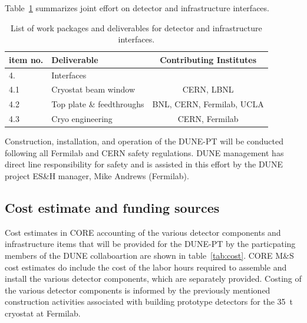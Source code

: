 Table~\ref{tab:wbs-interfaces} summarizes joint effort on detector and infrastructure interfaces.
%
\begin{table}[h]
\centering
\begin{tabular}{|l l c|}
\hline
\textbf{item no. } & \textbf{Deliverable}  & \textbf{Contributing Institutes}  \\ \hline
4. & Interfaces & \\ 
4.1  & Cryostat beam window &  CERN, LBNL \\
4.2  & Top plate \& feedthroughs &  BNL, CERN, Fermilab, UCLA \\
4.3  & Cryo engineering &  CERN, Fermilab \\ \hline
\end{tabular}
\caption{List of work packages and deliverables for detector and infrastructure interfaces.} 
\label{tab:wbs-interfaces}
\end{table}

Construction, installation, and operation of the DUNE-PT will be conducted following all Fermilab and CERN safety regulations.  
DUNE management has direct line responsibility for safety and is assisted in this effort by the DUNE project ES\&H manager, 
Mike Andrews (Fermilab). 
              





%

\subsection{Cost estimate and funding sources}
Cost estimates in CORE accounting of the various detector components and infrastructure items that 
will be provided for the DUNE-PT by the particpating members of the DUNE collaboartion are shown in 
table~\ref{tab:cost}.  CORE M\&S cost estimates do include the cost of the labor hours required to 
assemble and install the various detector components, which are separately provided.  Costing of the 
various detector components is informed by the previously mentioned construction activities associated 
with building prototype detectors for the 35~t cryostat at Fermilab.

